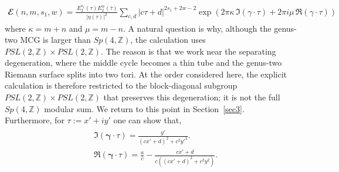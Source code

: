 \documentclass[12 pt]{article}
\begin{document}
\begin{align}
    \mathbfcal{E} (n,m,s_1,w)=\frac{\,E_2^{s_1}(\tau)E_2^w(\bar \tau)}{|\eta(\tau)|^2}\sum_{c,d}|c\tau+d|^{{2s_1+2w-2}}\exp\left(2\pi \kappa \,\Im(\gamma\cdot\tau)+2\pi i \mu\, \Re(\gamma\cdot \tau)\right)\label{2.21e}
\end{align}
where $\kappa=m+n$ and $\mu=m-n$. A natural question is why, although the genus-two MCG is larger than $Sp(4,\mathbb{Z})$, the calculation uses $PSL(2,\mathbb{Z})\times PSL(2,\mathbb{Z})$. The reason is that we work near the separating degeneration, where the middle cycle becomes a thin tube and the genus-two Riemann surface splits into two tori. At the order considered here, the explicit calculation is therefore restricted to the block-diagonal subgroup $PSL(2,\mathbb{Z})\times PSL(2,\mathbb{Z})$ that preserves this degeneration; it is not the full $Sp(4,\mathbb{Z})$ modular sum. We return to this point in Section~\ref{sec3}.\\
Furthermore, for $\tau:=x'+iy'$ one can show that, \begin{align}
\begin{split}
&\Im(\mathbf{\gamma}\cdot \tau)=\frac{y'}{(cx'+d)^2+c^2y'^2}.\\&
\Re(\mathbf{\gamma}\cdot \tau)=\frac{a}{c}-\frac{cx'+d}{c((cx'+d)^2+c^2y^2)}.
\end{split}
\end{align}
\end{document}
